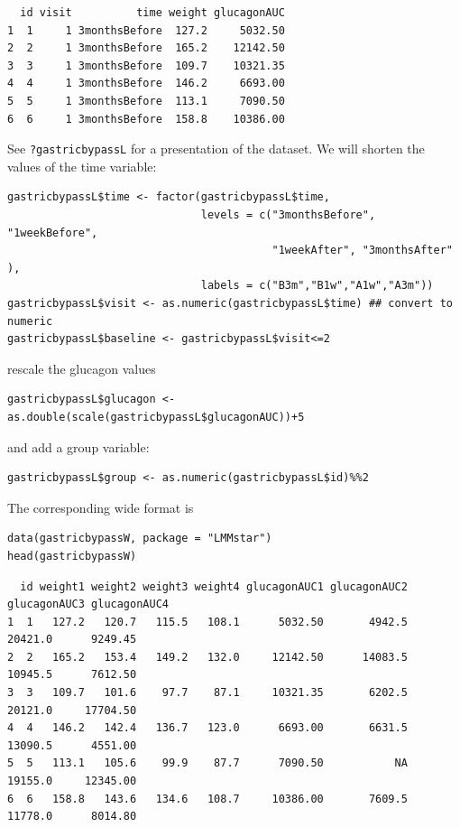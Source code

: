 \documentclass[12pt]{article}
\begin{document}
\begin{verbatim}
  id visit          time weight glucagonAUC
1  1     1 3monthsBefore  127.2     5032.50
2  2     1 3monthsBefore  165.2    12142.50
3  3     1 3monthsBefore  109.7    10321.35
4  4     1 3monthsBefore  146.2     6693.00
5  5     1 3monthsBefore  113.1     7090.50
6  6     1 3monthsBefore  158.8    10386.00
\end{verbatim}


See \texttt{?gastricbypassL} for a presentation of the dataset. We will
shorten the values of the time variable:
\lstset{language=r,label= ,caption= ,captionpos=b,numbers=none}
\begin{lstlisting}
gastricbypassL$time <- factor(gastricbypassL$time,
                              levels = c("3monthsBefore", "1weekBefore",
                                         "1weekAfter", "3monthsAfter" ),
                              labels = c("B3m","B1w","A1w","A3m"))
gastricbypassL$visit <- as.numeric(gastricbypassL$time) ## convert to numeric
gastricbypassL$baseline <- gastricbypassL$visit<=2
\end{lstlisting}
rescale the glucagon values
\lstset{language=r,label= ,caption= ,captionpos=b,numbers=none}
\begin{lstlisting}
gastricbypassL$glucagon <- as.double(scale(gastricbypassL$glucagonAUC))+5
\end{lstlisting}

and add a group variable:
\lstset{language=r,label= ,caption= ,captionpos=b,numbers=none}
\begin{lstlisting}
gastricbypassL$group <- as.numeric(gastricbypassL$id)%%2
\end{lstlisting}

The corresponding wide format is
\lstset{language=r,label= ,caption= ,captionpos=b,numbers=none}
\begin{lstlisting}
data(gastricbypassW, package = "LMMstar")
head(gastricbypassW)
\end{lstlisting}

\begin{verbatim}
  id weight1 weight2 weight3 weight4 glucagonAUC1 glucagonAUC2 glucagonAUC3 glucagonAUC4
1  1   127.2   120.7   115.5   108.1      5032.50       4942.5      20421.0      9249.45
2  2   165.2   153.4   149.2   132.0     12142.50      14083.5      10945.5      7612.50
3  3   109.7   101.6    97.7    87.1     10321.35       6202.5      20121.0     17704.50
4  4   146.2   142.4   136.7   123.0      6693.00       6631.5      13090.5      4551.00
5  5   113.1   105.6    99.9    87.7      7090.50           NA      19155.0     12345.00
6  6   158.8   143.6   134.6   108.7     10386.00       7609.5      11778.0      8014.80
\end{verbatim}
\end{document}
